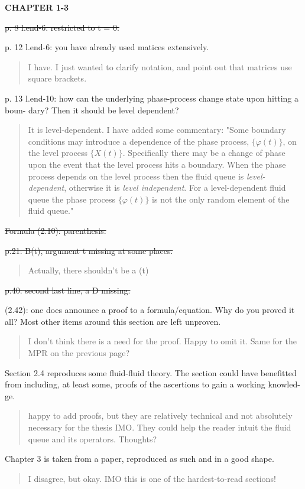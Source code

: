 \documentclass[a4paper]{article}
\begin{document}
\textbf{CHAPTER 1-3}

\st{p. 8 l.end-6: restricted to t = 0.}

p. 12 l.end-6: you have already used matices extensively.
\begin{quote}
    I have. I just wanted to clarify notation, and point out that matrices use square brackets. 
\end{quote}

p. 13 l.end-10: how can the underlying phase-process change state upon hitting a boun-
dary? Then it should be level dependent?
\begin{quote}
    It is level-dependent. I have added some commentary: "Some boundary conditions may introduce a dependence of the phase process, \(\{\varphi(t)\}\), on the level process \(\{X(t)\}\). Specifically there may be a change of phase upon the event that the level process hits a boundary. When the phase process depends on the level process then the fluid queue is \emph{level-dependent}, otherwise it is \emph{level independent}. For a level-dependent fluid queue the phase process \(\{\varphi(t)\}\) is not the only random element of the fluid queue."
\end{quote}

\st{Formula (2.10): parenthesis.}

\st{p.21: B(t), argument t missing at some places.}
\begin{quote}
    Actually, there shouldn't be a (t)
\end{quote}

\st{p.40: second last line, a D missing.}

(2.42): one does announce a proof to a formula/equation. Why do you proved it all? Most other items around this section are left unproven.
\begin{quote}
    I don't think there is a need for the proof. Happy to omit it. Same for the MPR on the previous page?
\end{quote}

Section 2.4 reproduces some fluid-fluid theory. The section could have benefitted
from including, at least some, proofs of the ascertions to gain a working knowled-
ge.
\begin{quote}
    happy to add proofs, but they are relatively technical and not absolutely necessary for the thesis IMO. They could help the reader intuit the fluid queue and its operators. Thoughts?
\end{quote}

Chapter 3 is taken from a paper, reproduced as such and in a good shape.
\begin{quote}
    I disagree, but okay. IMO this is one of the hardest-to-read sections!
\end{quote}
\end{document}
